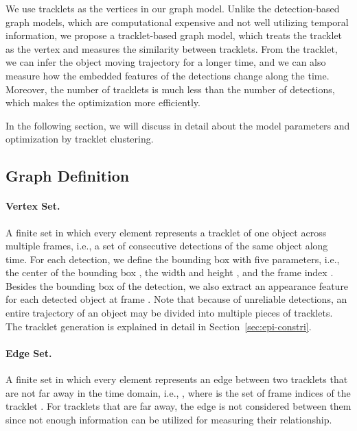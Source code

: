 \documentclass[10pt,twocolumn,letterpaper]{article}
\begin{document}
We use tracklets as the vertices in our graph model. Unlike the detection-based graph models, which are computational expensive and not well utilizing temporal information, we propose a tracklet-based graph model, which treats the tracklet as the vertex and measures the similarity between tracklets. From the tracklet, we can infer the object moving trajectory for a longer time, and we can also measure how the embedded features of the detections change along the time. Moreover, the number of tracklets is much less than the number of detections, which makes the optimization more efficiently.

In the following section, we will discuss in detail about the model parameters and optimization by tracklet clustering.

\subsection{Graph Definition }
\label{sec:graph-def}




\paragraph{Vertex Set.} 
A finite set  in which every element  represents a tracklet of one object across multiple frames, i.e., a set of consecutive detections of the same object along time. For each detection, we define the bounding box with five parameters, i.e., the center 
of the bounding box , the width and height , and the frame index . Besides the bounding box of the detection, we also extract an appearance feature \cite{schroff2015facenet} for each detected object at frame . Note that because of unreliable detections, an entire trajectory of an object may be divided into multiple pieces of tracklets. The tracklet generation is explained in detail in Section~\ref{sec:epi-constri}.






\paragraph{Edge Set.} A finite set  in which every element  represents an edge between two tracklets  that are not far away in the time domain, i.e., ,
where  is the set of frame indices of the tracklet . For tracklets that are far away, the edge is not considered between them since not enough information can be utilized for measuring their relationship. 
\end{document}
